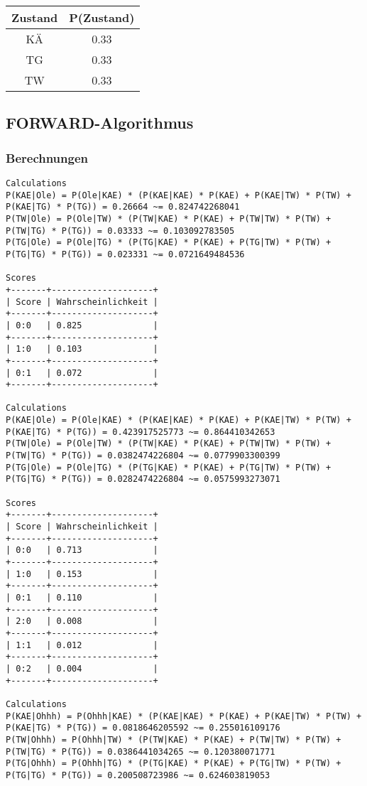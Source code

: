 \documentclass[a4paper]{article}
\begin{document}
\begin{tabular}{|c|c|}
\hline
Zustand & P(Zustand) \\\hline
KÄ & 0.33 \\
TG & 0.33 \\
TW & 0.33 \\\hline
\end{tabular}

\subsection{FORWARD-Algorithmus}
\subsubsection{Berechnungen}
\begin{lstlisting}
Calculations
P(KAE|Ole) = P(Ole|KAE) * (P(KAE|KAE) * P(KAE) + P(KAE|TW) * P(TW) + P(KAE|TG) * P(TG)) = 0.26664 ~= 0.824742268041
P(TW|Ole) = P(Ole|TW) * (P(TW|KAE) * P(KAE) + P(TW|TW) * P(TW) + P(TW|TG) * P(TG)) = 0.03333 ~= 0.103092783505
P(TG|Ole) = P(Ole|TG) * (P(TG|KAE) * P(KAE) + P(TG|TW) * P(TW) + P(TG|TG) * P(TG)) = 0.023331 ~= 0.0721649484536

Scores
+-------+--------------------+
| Score | Wahrscheinlichkeit |
+-------+--------------------+
| 0:0   | 0.825              |
+-------+--------------------+
| 1:0   | 0.103              |
+-------+--------------------+
| 0:1   | 0.072              |
+-------+--------------------+

Calculations
P(KAE|Ole) = P(Ole|KAE) * (P(KAE|KAE) * P(KAE) + P(KAE|TW) * P(TW) + P(KAE|TG) * P(TG)) = 0.423917525773 ~= 0.864410342653
P(TW|Ole) = P(Ole|TW) * (P(TW|KAE) * P(KAE) + P(TW|TW) * P(TW) + P(TW|TG) * P(TG)) = 0.0382474226804 ~= 0.0779903300399
P(TG|Ole) = P(Ole|TG) * (P(TG|KAE) * P(KAE) + P(TG|TW) * P(TW) + P(TG|TG) * P(TG)) = 0.0282474226804 ~= 0.0575993273071

Scores
+-------+--------------------+
| Score | Wahrscheinlichkeit |
+-------+--------------------+
| 0:0   | 0.713              |
+-------+--------------------+
| 1:0   | 0.153              |
+-------+--------------------+
| 0:1   | 0.110              |
+-------+--------------------+
| 2:0   | 0.008              |
+-------+--------------------+
| 1:1   | 0.012              |
+-------+--------------------+
| 0:2   | 0.004              |
+-------+--------------------+

Calculations
P(KAE|Ohhh) = P(Ohhh|KAE) * (P(KAE|KAE) * P(KAE) + P(KAE|TW) * P(TW) + P(KAE|TG) * P(TG)) = 0.0818646205592 ~= 0.255016109176
P(TW|Ohhh) = P(Ohhh|TW) * (P(TW|KAE) * P(KAE) + P(TW|TW) * P(TW) + P(TW|TG) * P(TG)) = 0.0386441034265 ~= 0.120380071771
P(TG|Ohhh) = P(Ohhh|TG) * (P(TG|KAE) * P(KAE) + P(TG|TW) * P(TW) + P(TG|TG) * P(TG)) = 0.200508723986 ~= 0.624603819053


\end{lstlisting}
\end{document}

